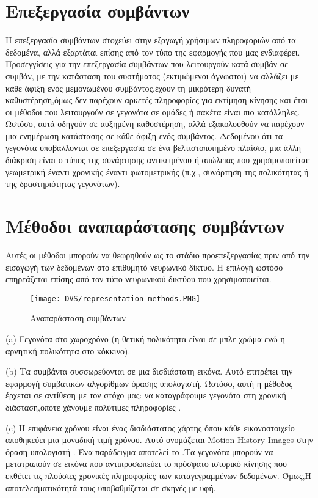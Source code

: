 \documentclass[12pt]{report}
\begin{document}
\section{Επεξεργασία συμβάντων}
Η επεξεργασία συμβάντων στοχεύει στην εξαγωγή χρήσιμων πληροφοριών από τα δεδομένα, αλλά εξαρτάται επίσης από τον τύπο της εφαρμογής που μας ενδιαφέρει. Προσεγγίσεις για την επεξεργασία συμβάντων που λειτουργούν κατά συμβάν σε συμβάν, με την κατάσταση του συστήματος (εκτιμώμενοι άγνωστοι) να αλλάζει με κάθε άφιξη ενός μεμονωμένου συμβάντος,έχουν τη μικρότερη δυνατή καθυστέρηση,όμως δεν παρέχουν αρκετές πληροφορίες για εκτίμηση κίνησης και έτσι οι μέθοδοι που λειτουργούν σε γεγονότα σε ομάδες ή πακέτα είναι πιο κατάλληλες. Ωστόσο, αυτά οδηγούν σε αυξημένη καθυστέρηση, αλλά εξακολουθούν να παρέχουν μια  ενημέρωση κατάστασης σε κάθε άφιξη ενός συμβάντος. Δεδομένου ότι τα γεγονότα υποβάλλονται σε επεξεργασία σε ένα βελτιστοποιημένο πλαίσιο, μια άλλη διάκριση είναι ο τύπος της συνάρτησης αντικειμένου ή απώλειας που χρησιμοποιείται: γεωμετρική έναντι χρονικής έναντι φωτομετρικής (π.χ., συνάρτηση της πολικότητας ή της δραστηριότητας γεγονότων).

\section{Μέθοδοι αναπαράστασης συμβάντων}
Αυτές οι μέθοδοι μπορούν να θεωρηθούν ως το στάδιο προεπεξεργασίας πριν από την εισαγωγή των δεδομένων στο επιθυμητό νευρωνικό δίκτυο. Η επιλογή ωστόσο επηρεάζεται επίσης από τον τύπο νευρωνικού δικτύου που χρησιμοποιείται.
\begin{figure}[htp] %
    \centering
     \texttt{[image: DVS/representation-methods.PNG]}
    \caption{Αναπαράσταση συμβάντων}
    \label{fig:representation-methods}
\end{figure}


(\textlatin{a}) Γεγονότα στο χωροχρόνο (η θετική πολικότητα είναι σε μπλε χρώμα ενώ η αρνητική πολικότητα στο κόκκινο).

(\textlatin{b}) Τα συμβάντα συσσωρεύονται σε μια δισδιάστατη εικόνα. Αυτό επιτρέπει την εφαρμογή συμβατικών αλγορίθμων όρασης υπολογιστή. Ωστόσο, αυτή η μέθοδος έρχεται σε αντίθεση με τον στόχο μας: να καταγράφουμε γεγονότα στη χρονική διάσταση,οπότε χάνουμε πολύτιμες πληροφορίες .

(\textlatin{c}) Η επιφάνεια χρόνου είναι ένας δισδιάστατος χάρτης όπου κάθε εικονοστοιχείο αποθηκεύει μια μοναδική τιμή χρόνου. Αυτό ονομάζεται \textlatin{Motion History Images} στην όραση υπολογιστή \cite{ahad2012}. Ένα παράδειγμα αποτελεί το \cite{lagorge2017} .Τα γεγονότα μπορούν να μετατραπούν σε εικόνα που αντιπροσωπεύει το πρόσφατο ιστορικό κίνησης που εκθέτει τις πλούσιες χρονικές πληροφορίες των καταγεγραμμένων δεδομένων. Όμως,Η αποτελεσματικότητά τους υποβαθμίζεται σε σκηνές με υφή.
\end{document}
